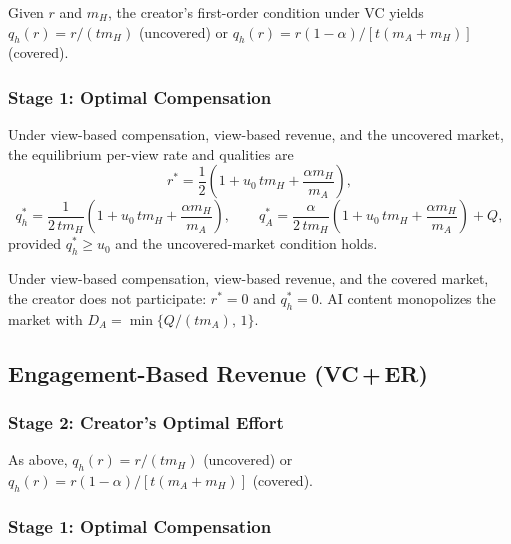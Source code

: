 \documentclass[mnsc,nonblindrev]{informs3_NoOR}
\begin{document}
Given $r$ and $ m_H$, the creator's first-order condition under VC yields
$q_h(r) = {r}/({t m_H})$ (uncovered) or $q_h(r) = r(1-\alpha)/[t(m_A+m_H)]$ (covered).
 
\subsubsection{Stage 1: Optimal Compensation}
 
\begin{proposition}[VC\,+\,VR, Uncovered]\label{prop:VCVR-unc}
Under view-based compensation, view-based revenue, and the uncovered market, the equilibrium per-view rate and qualities are
\begin{equation}\label{eq:rVCVR}
r^{*} = \frac{1}{2}\!\left(1 + u_0\,t m_H + \frac{\alpha m_H}{ m_A}\right),
\end{equation}
\begin{equation}\label{eq:qhVCVR}
q_h^{*} = \frac{1}{2\,t m_H}\!\left(1 + u_0\,t m_H + \frac{\alpha m_H}{ m_A}\right), \qquad
q_A^{*} = \frac{\alpha}{2\,t m_H}\!\left(1 + u_0\,t m_H + \frac{\alpha m_H}{ m_A}\right) + Q,
\end{equation}
provided $q_h^* \geq u_0$ and the uncovered-market condition holds.
\end{proposition}
 
\begin{proposition}[VC\,+\,VR, Covered]\label{prop:VCVR-cov}
Under view-based compensation, view-based revenue, and the covered market, the creator does not participate: $r^* = 0$ and $q_h^* = 0$. AI content monopolizes the market with $D_A = \min\{Q/(tm_A),\, 1\}$.
\end{proposition}


 \vfill
 \pagebreak
\subsection{Engagement-Based Revenue (VC\,+\,ER)}
 
\subsubsection{Stage 2: Creator's Optimal Effort}
 
As above, $q_h(r) = {r}/({t m_H})$ (uncovered) or $q_h(r) = r(1-\alpha)/[t(m_A+m_H)]$ (covered).
 
\subsubsection{Stage 1: Optimal Compensation}
 
\end{document}
